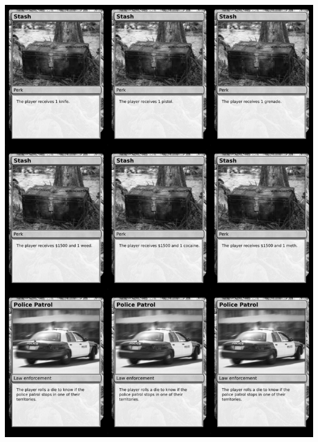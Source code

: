 \documentclass[a4paper]{article}
\begin{document}
\begin{center}
	\centering
	\includegraphics[width=190.5mm,height=266.7mm]{output/temp/page28.png}
\end{center}

\newpage
\end{document}
